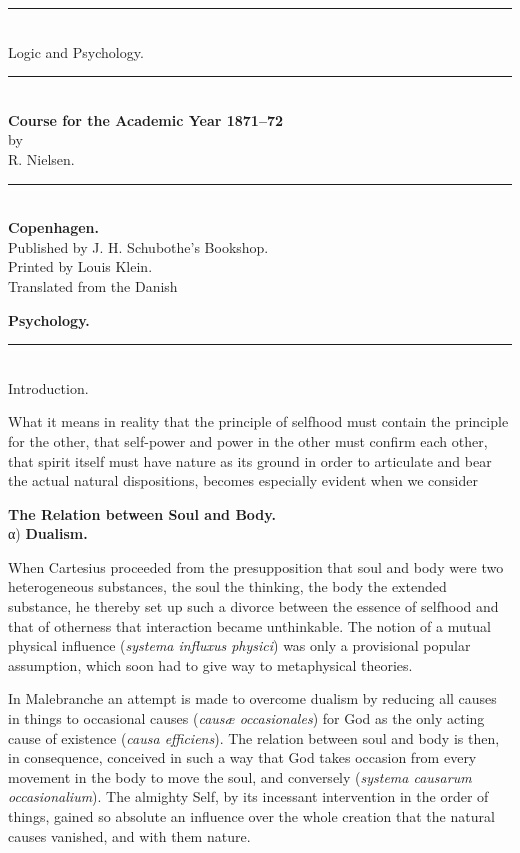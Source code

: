 \documentclass[12pt,a4paper,openany]{book}
\newcommand{\opage}[1]{\marginnote{\footnotesize\textit{[#1]}}}
\begin{document}
\begin{titlepage}
\begin{center}
\vspace*{6em}
\rule{3em}{0.4pt}\\[1.5em]
{\LARGE Logic and Psychology.}\\[1.5em]
\rule{3em}{0.4pt}\\[1.5em]
{\large\textbf{Course for the Academic Year 1871--72}}\\[1.5em]
{\small by}\\[1em]
{\Large R. Nielsen.}\\[2em]
\rule{3em}{0.4pt}\\[2em]
\textbf{Copenhagen.}\\[0.5em]
{\small Published by J. H. Schubothe's Bookshop.}\\[3em]
{\small Printed by Louis Klein.}\\[3em]
{\small Translated from the Danish}
\end{center}
\end{titlepage}

\opage{1}\begin{center}
{\Large\textbf{Psychology.}}\\[0.4em]
\rule{4em}{0.4pt}\\[0.4em]
Introduction.
\end{center}

What it means in reality that the principle of selfhood must contain the principle for the other, that self-power and
power in the other must confirm each other, that spirit itself must have nature as its ground in order to articulate
and bear the actual natural dispositions, becomes especially evident when we consider

\begin{center}
\textbf{The Relation between Soul and Body.}\\[0.6em]
α) \textbf{Dualism.}
\end{center}

When Cartesius proceeded from the presupposition that soul and body were two heterogeneous substances, the soul the
thinking, the body the extended substance, he thereby set up such a divorce between the essence of selfhood and that
of otherness that interaction became unthinkable. The notion of a mutual physical influence (\textit{systema influxus
physici}) was only a provisional popular assumption, which soon had to give way to metaphysical theories.

In Malebranche an attempt is made to overcome dualism by reducing all causes in things to occasional causes
(\textit{causæ occasionales}) for God as the only acting cause of existence (\textit{causa efficiens}). The relation
between soul and body is then, in consequence, conceived in such a way that God takes occasion from every movement in
the body to move the soul, and conversely (\textit{systema causarum occasionalium}). The almighty Self, by its incessant
intervention in the order of things, gained so absolute an influence over the whole creation that the natural causes
vanished, and with them nature.
\end{document}
